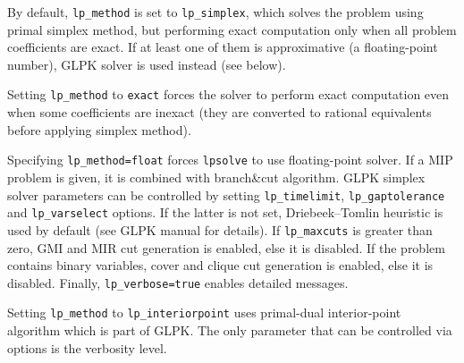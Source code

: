 \documentclass[a4paper,11pt]{book}
\begin{document}
By default, {\tt lp\_method} is set to {\tt lp\_simplex}, which solves the problem using primal simplex method, but performing exact computation only when all problem coefficients are exact. If at least one of them is approximative (a floating-point number), GLPK solver is used instead (see below). 

Setting {\tt lp\_method} to {\tt exact} forces the solver to perform exact computation even when some coefficients are inexact (they are converted to rational equivalents before applying simplex method).

Specifying {\tt lp\_method=float} forces {\tt lpsolve} to use floating-point solver. If a MIP problem is given, it is combined with branch\&cut algorithm. GLPK simplex solver parameters can be controlled by setting {\tt lp\_timelimit}, {\tt lp\_gaptolerance} and {\tt lp\_varselect} options. If the latter is not set, Driebeek--Tomlin heuristic is used by default (see GLPK manual for details). If {\tt lp\_maxcuts} is greater than zero, GMI and MIR cut generation is enabled, else it is disabled. If the problem contains binary variables, cover and clique cut generation is enabled, else it is disabled. Finally, {\tt lp\_verbose=true} enables detailed messages.

Setting {\tt lp\_method} to {\tt lp\_interiorpoint} uses primal-dual interior-point algorithm which is part of GLPK. The only parameter that can be controlled via options is the verbosity level.
\end{document}

